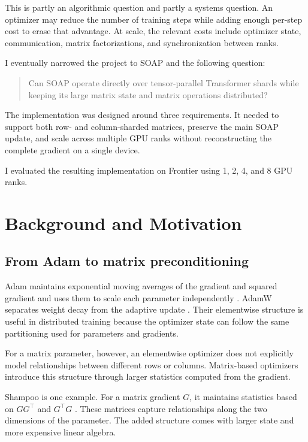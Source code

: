 \documentclass[11pt]{article}
\begin{document}
This is partly an algorithmic question and partly a systems question. An optimizer may reduce the number of training steps while adding enough per-step cost to erase that advantage. At scale, the relevant costs include optimizer state, communication, matrix factorizations, and synchronization between ranks.

I eventually narrowed the project to SOAP and the following question:

\begin{quote}
Can SOAP operate directly over tensor-parallel Transformer shards while keeping its large matrix state and matrix operations distributed?
\end{quote}

The implementation was designed around three requirements. It needed to support both row- and column-sharded matrices, preserve the main SOAP update, and scale across multiple GPU ranks without reconstructing the complete gradient on a single device.

I evaluated the resulting implementation on Frontier using 1, 2, 4, and 8 GPU ranks.

\section{Background and Motivation}

\subsection{From Adam to matrix preconditioning}

Adam maintains exponential moving averages of the gradient and squared gradient and uses them to scale each parameter independently \citep{kingma2014adam}. AdamW separates weight decay from the adaptive update \citep{loshchilov2017adamw}. Their elementwise structure is useful in distributed training because the optimizer state can follow the same partitioning used for parameters and gradients.

For a matrix parameter, however, an elementwise optimizer does not explicitly model relationships between different rows or columns. Matrix-based optimizers introduce this structure through larger statistics computed from the gradient.

Shampoo is one example. For a matrix gradient $G$, it maintains statistics based on $GG^\top$ and $G^\top G$ \citep{gupta2018shampoo}. These matrices capture relationships along the two dimensions of the parameter. The added structure comes with larger state and more expensive linear algebra.
\end{document}
